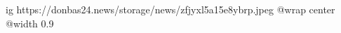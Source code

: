  
 
 
 
 

\ifcmt
  ig https://donbas24.news/storage/news/zfjyxl5a15e8ybrp.jpeg
  @wrap center
  @width 0.9
\fi

